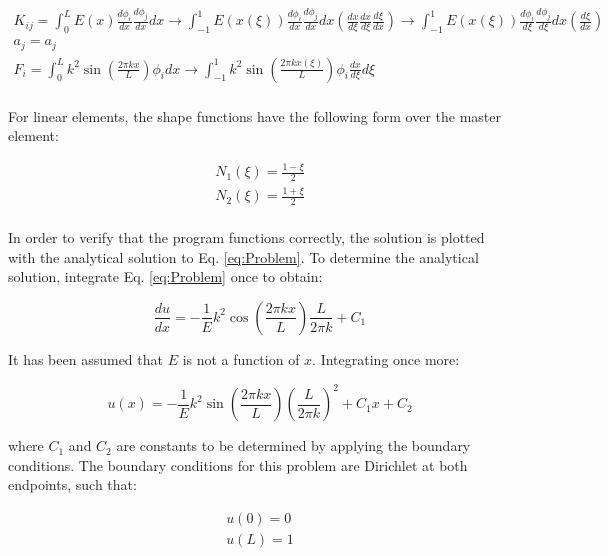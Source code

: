 \documentclass[10pt]{article}
\begin{document}
\begin{equation}
\begin{aligned}
K_{ij}=\int_{0}^{L}E(x)\frac{d\phi_i}{dx}\frac{d\phi_j}{dx}dx\rightarrow\int_{-1}^{1}E(x(\xi))\frac{d\phi_i}{dx}\frac{d\phi_j}{dx}dx\left(\frac{dx}{d\xi}\frac{dx}{d\xi}\frac{d\xi}{dx}\right)\rightarrow\int_{-1}^{1}E(x(\xi))\frac{d\phi_i}{d\xi}\frac{d\phi_j}{d\xi}dx\left(\frac{d\xi}{dx}\right)\\
a_j=a_j\\
F_i=\int_{0}^{L}k^2\sin{\left(\frac{2\pi kx}{L}\right)}\phi_idx\rightarrow\int_{-1}^{1}k^2\sin{\left(\frac{2\pi kx(\xi)}{L}\right)}\phi_i\frac{dx}{d\xi}d\xi\\
\end{aligned}
\end{equation} 

For linear elements, the shape functions have the following form over the master element:

\begin{equation}
\begin{aligned}
N_1(\xi)=\frac{1-\xi}{2}\\
N_2(\xi)=\frac{1+\xi}{2}\\
\end{aligned}
\end{equation}

In order to verify that the program functions correctly, the solution is plotted with the analytical solution to Eq. \eqref{eq:Problem}. To determine the analytical solution, integrate Eq. \eqref{eq:Problem} once to obtain:

\begin{equation}
\label{eq:Problem2}
\frac{du}{dx}=-\frac{1}{E}k^2\cos{\left(\frac{2\pi kx}{L}\right)}\frac{L}{2\pi k}+C_1
\end{equation}

It has been assumed that \(E\) is not a function of \(x\). Integrating once more:

\begin{equation}
\label{eq:Problem2}
u(x)=-\frac{1}{E}k^2\sin{\left(\frac{2\pi kx}{L}\right)}\left(\frac{L}{2\pi k}\right)^2+C_1x+C_2
\end{equation}

where \(C_1\) and \(C_2\) are constants to be determined by applying the boundary conditions. The boundary conditions for this problem are Dirichlet at both endpoints, such that:

\begin{equation}
\begin{aligned}
u(0)=0\\
u(L)=1\\
\end{aligned}
\end{equation}
\end{document}
